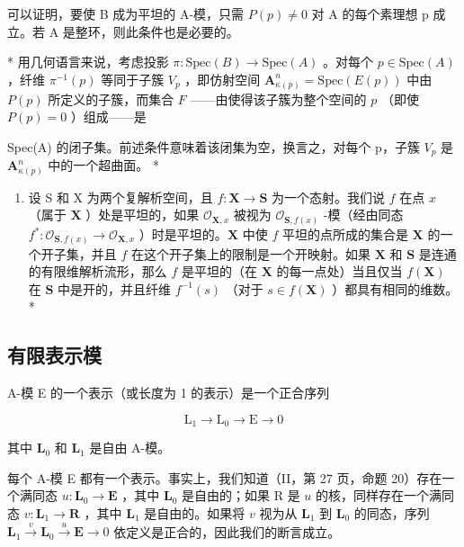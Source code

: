 可以证明，要使 B 成为平坦的 A-模，只需 \(P(p) \neq 0\) 对 A 的每个素理想 p 成立。若 A 是整环，则此条件也是必要的。

* 用几何语言来说，考虑投影 \(\pi: \text{Spec}(B) \to \text{Spec}(A)\) 。对每个 \(p \in \text{Spec}(A)\) ，纤维 \(\pi^{-1}(p)\) 等同于子簇 \(V_p\) ，即仿射空间 \(\mathbf{A}_{\kappa(p)}^n = \text{Spec}(E(p))\) 中由 \(P(p)\) 所定义的子簇，而集合 \(F\) ——由使得该子簇为整个空间的 \(p\) （即使 \(P(p) = 0\) ）组成——是

Spec(A) 的闭子集。前述条件意味着该闭集为空，换言之，对每个 p，子簇 \(V_{p}\) 是 \(\mathbf{A}_{\kappa(p)}^{n}\) 中的一个超曲面。 *

\begin{enumerate}
\def\labelenumi{\arabic{enumi})}
\setcounter{enumi}{10}
\tightlist
\item
  设 S 和 X 为两个复解析空间，且 \(f: \mathbf{X} \to \mathbf{S}\) 为一个态射。我们说 \(f\) 在点 \(x\) （属于 \(\mathbf{X}\) ）处是平坦的，如果 \(\mathcal{O}_{\mathbf{X},x}\) 被视为 \(\mathcal{O}_{\mathbf{S},f(x)}\) -模（经由同态 \(f^{*}: \mathcal{O}_{\mathbf{S},f(x)} \to \mathcal{O}_{\mathbf{X},x}\) ）时是平坦的。\(\mathbf{X}\) 中使 \(f\) 平坦的点所成的集合是 \(\mathbf{X}\) 的一个开子集，并且 \(f\) 在这个开子集上的限制是一个开映射。如果 \(\mathbf{X}\) 和 \(\mathbf{S}\) 是连通的有限维解析流形，那么 \(f\) 是平坦的（在 \(\mathbf{X}\) 的每一点处）当且仅当 \(f(\mathbf{X})\) 在 \(\mathbf{S}\) 中是开的，并且纤维 \(f^{-1}(s)\) （对于 \(s \in f(\mathbf{X})\) ）都具有相同的维数。*
\end{enumerate}

\subsection{有限表示模}

A-模 E 的一个表示（或长度为 1 的表示）是一个正合序列

\[
\mathrm{L} _ {1} \rightarrow \mathrm{L} _ {0} \rightarrow \mathrm{E} \rightarrow 0\tag{13}
\]

其中 \(\mathbf{L}_0\) 和 \(\mathbf{L}_1\) 是自由 A-模。

每个 A-模 E 都有一个表示。事实上，我们知道（II，第 27 页，命题 20）存在一个满同态 \(u: \mathbf{L}_0 \to \mathbf{E}\) ，其中 \(\mathbf{L}_0\) 是自由的；如果 R 是 \(u\) 的核，同样存在一个满同态 \(v: \mathbf{L}_1 \to \mathbf{R}\) ，其中 \(\mathbf{L}_1\) 是自由的。如果将 \(v\) 视为从 \(\mathbf{L}_1\) 到 \(\mathbf{L}_0\) 的同态，序列 \(\mathbf{L}_1 \xrightarrow{v} \mathbf{L}_0 \xrightarrow{u} \mathbf{E} \longrightarrow 0\) 依定义是正合的，因此我们的断言成立。

